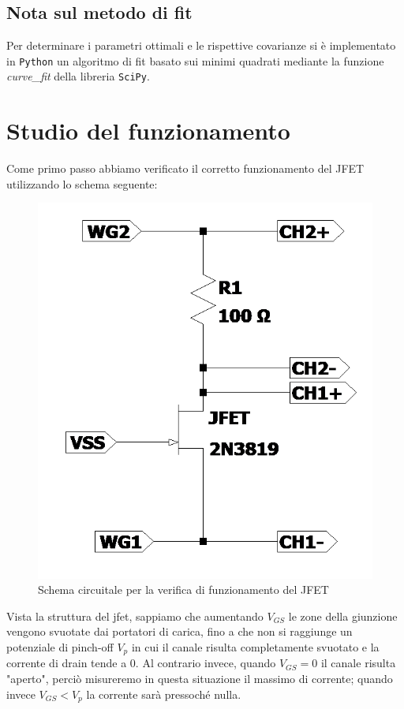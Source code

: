 \documentclass[10pt, a4paper, italian]{article}
\begin{document}
\subsection*{Nota sul metodo di fit}
Per determinare i parametri ottimali e le rispettive covarianze si \`e
implementato in \verb+Python+ un algoritmo di fit basato sui minimi quadrati
mediante la funzione \emph{curve\_fit} della libreria \texttt{SciPy}.

\section{Studio del funzionamento}
Come primo passo abbiamo verificato il corretto funzionamento del JFET utilizzando lo schema seguente:
\begin{figure}[H]
    \centering
	\includegraphics[scale=0.5]{Draft1}
    \caption{Schema circuitale per la verifica di funzionamento del JFET}
\end{figure}
Vista la struttura del jfet, sappiamo che aumentando $V_{GS}$ le zone della giunzione vengono svuotate dai portatori di carica, fino a che non si raggiunge un potenziale di pinch-off $V_p$ in cui il canale risulta completamente svuotato e la corrente di drain tende a 0. Al contrario invece, quando $V_{GS}=0$ il canale risulta "aperto", perciò misureremo in questa situazione il massimo di corrente; quando invece $V_{GS}<V_p$ la corrente sarà pressoché nulla.
\end{document}
